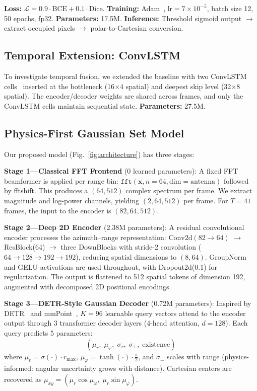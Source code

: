 \documentclass[conference]{IEEEtran}
\begin{document}
\textbf{Loss:} $\mathcal{L} = 0.9 \cdot \text{BCE} + 0.1 \cdot \text{Dice}$.
\textbf{Training:} Adam~\cite{kingma2015adam}, $\text{lr} = 7\!\times\!10^{-5}$, batch size 12, 50 epochs, fp32.
\textbf{Parameters:} 17.5M.
\textbf{Inference:} Threshold sigmoid output $\rightarrow$ extract occupied pixels $\rightarrow$ polar-to-Cartesian conversion.

\subsection{Temporal Extension: ConvLSTM}

To investigate temporal fusion, we extended the baseline with two ConvLSTM cells~\cite{xingjian2015convlstm} inserted at the bottleneck (16$\times$4 spatial) and deepest skip level (32$\times$8 spatial).
The encoder/decoder weights are shared across frames, and only the ConvLSTM cells maintain sequential state.
\textbf{Parameters:} 27.5M.

\subsection{Physics-First Gaussian Set Model}

Our proposed model (Fig.~\ref{fig:architecture}) has three stages:

\textbf{Stage 1---Classical FFT Frontend} (0 learned parameters):
A fixed FFT beamformer is applied per range bin: $\texttt{fft}(\mathbf{x}, n\!=\!64, \text{dim}\!=\!\text{antenna})$ followed by fftshift.
This produces a $(64, 512)$ complex spectrum per frame.
We extract magnitude and log-power channels, yielding $(2, 64, 512)$ per frame.
For $T\!=\!41$ frames, the input to the encoder is $(82, 64, 512)$.

\textbf{Stage 2---Deep 2D Encoder} (2.38M parameters):
A residual convolutional encoder processes the azimuth--range representation:
$\text{Conv2d}(82 \!\to\! 64)$ $\to$ ResBlock(64) $\to$ three DownBlocks with stride-2 convolution ($64 \!\to\! 128 \!\to\! 192 \!\to\! 192$), reducing spatial dimensions to $(8, 64)$.
GroupNorm and GELU activations are used throughout, with Dropout2d(0.1) for regularization.
The output is flattened to 512 spatial tokens of dimension 192, augmented with decomposed 2D positional encodings.

\textbf{Stage 3---DETR-Style Gaussian Decoder} (0.72M parameters):
Inspired by DETR~\cite{carion2020detr} and mmPoint~\cite{xie2023mmpoint}, $K\!=\!96$ learnable query vectors attend to the encoder output through 3 transformer decoder layers (4-head attention, $d\!=\!128$).
Each query predicts 5 parameters:
\begin{equation}
  (\mu_r,\; \mu_\varphi,\; \sigma_r,\; \sigma_\perp,\; \text{existence})
\end{equation}
where $\mu_r = \sigma(\cdot) \cdot r_{\max}$, $\mu_\varphi = \tanh(\cdot) \cdot \frac{\pi}{2}$, and $\sigma_\perp$ scales with range (physics-informed: angular uncertainty grows with distance).
Cartesian centers are recovered as $\mu_{xy} = (\mu_r \cos\mu_\varphi,\; \mu_r \sin\mu_\varphi)$.
\end{document}
